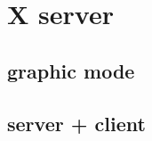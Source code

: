 \section{X server}
\label{sec:Xserver}
\subsection{graphic mode}
\subsection{server + client}
\newpage
